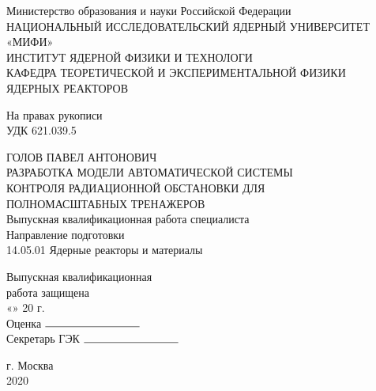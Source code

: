 \begin{titlepage}
	\begin{center}
		\small 
		Министерство образования и науки Российской Федерации\\
		НАЦИОНАЛЬНЫЙ ИССЛЕДОВАТЕЛЬСКИЙ ЯДЕРНЫЙ УНИВЕРСИТЕТ «МИФИ»\\[0.6cm]

		ИНСТИТУТ ЯДЕРНОЙ ФИЗИКИ И ТЕХНОЛОГИ\\[0.7cm]
		КАФЕДРА ТЕОРЕТИЧЕСКОЙ И ЭКСПЕРИМЕНТАЛЬНОЙ ФИЗИКИ \\ЯДЕРНЫХ РЕАКТОРОВ\\[1.6cm]

		\setlength{\leftskip}{13cm}

		На правах рукописи\\
		УДК 621.039.5\\[1.5cm]
	\end{center} 
	\begin{center}
		\small{ГОЛОВ ПАВЕЛ АНТОНОВИЧ}\\[0.6cm]
		
		РАЗРАБОТКА МОДЕЛИ АВТОМАТИЧЕСКОЙ СИСТЕМЫ \\ КОНТРОЛЯ РАДИАЦИОННОЙ ОБСТАНОВКИ ДЛЯ \\ПОЛНОМАСШТАБНЫХ ТРЕНАЖЕРОВ\\[1.5cm]

		\normalsize
		Выпускная квалификационная работа специалиста\\[1.3cm]

		\small
		Направление подготовки\\
		14.05.01 Ядерные реакторы и материалы\\[2.0cm]

		\setlength{\leftskip}{10cm}

		Выпускная квалификационная\\ работа защищена \\
		«\hspace{0.5cm}» \hspace{2cm} 20 \hspace{0.5cm} г.\\
		Оценка $\rule{3cm}{0.15mm}$\\
		Секретарь ГЭК $\rule{3cm}{0.15mm}$\\[2.7cm]
	\end{center}
	\begin{center}
		\small
		г. Москва\\
		2020
	\end{center}
	\thispagestyle{empty}
\end{titlepage}
